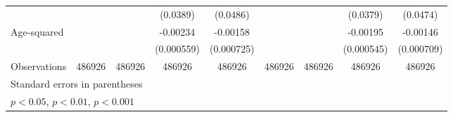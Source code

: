 \begin{table}[htbp]
\begin{tabular}{l*{8}{c}}
                         &                     &                     &    (0.0389)         &    (0.0486)         &                     &                     &    (0.0379)         &    (0.0474)         \\
[1em]
Age-squared              &                     &                     &    -0.00234\sym{***}&    -0.00158\sym{*}  &                     &                     &    -0.00195\sym{***}&    -0.00146\sym{*}  \\
                         &                     &                     &  (0.000559)         &  (0.000725)         &                     &                     &  (0.000545)         &  (0.000709)         \\
\hline
Observations             &      486926         &      486926         &      486926         &      486926         &      486926         &      486926         &      486926         &      486926         \\
\hline\hline
\multicolumn{9}{l}{\footnotesize Standard errors in parentheses}\\
\multicolumn{9}{l}{\footnotesize \sym{*} \(p<0.05\), \sym{**} \(p<0.01\), \sym{***} \(p<0.001\)}\\
\end{tabular}
\end{table}
